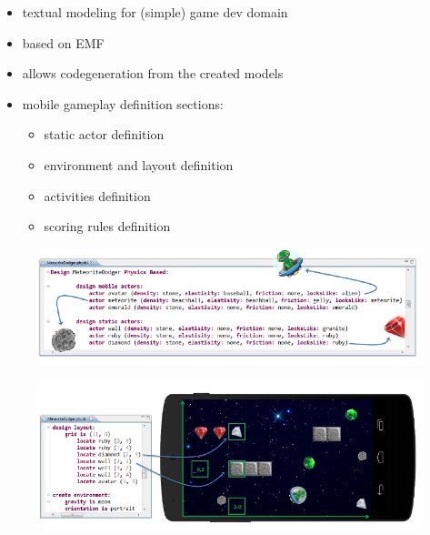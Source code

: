 \documentclass[runningheads,a4paper]{llncs}
\begin{document}
  \begin{itemize}
  \item textual modeling for (simple) game dev domain
  \item based on EMF
  \item allows codegeneration from the created models
  \item mobile gameplay definition sections:
    \begin{itemize}
    \item static actor definition
    \item environment and layout definition
    \item activities definition
    \item scoring rules definition
    \end{itemize}
  
  \end{itemize}
     \begin{figure}[htbp]
      \centering
      \includegraphics[width=\textwidth]{images/PhyDSL1.PNG}
    \end{figure}
       \begin{figure}[htbp]
      \centering
      \includegraphics[width=\textwidth]{images/PhyDSL2.PNG}
    \end{figure}
\end{document}
